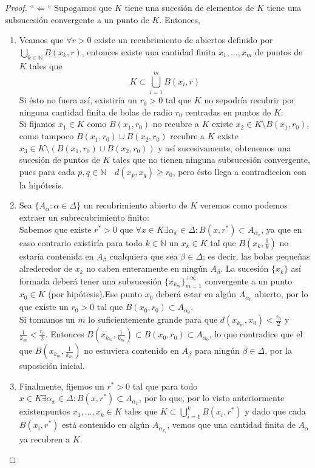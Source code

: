 \begin{proof}
    ``$\Leftarrow$``
    Supogamos que $K$ tiene una sucesión de elementos de $K$ tiene una subsucesión convergente a un punto de $K$. Entonces,
    \begin{enumerate}
        \item Veamos que $\forall r > 0$ existe un recubrimiento de abiertos definido por $\bigcup_{k \in \mathbb{N}} B(x_k, r)$, entonces existe una cantidad finita $x_1, \ldots, x_m$ de puntos de $K$ tales que $$K \subset \bigcup_{i = 1}^{m} B(x_i, r)$$ \newline
        Si ésto no fuera así, existiría un $r_0 > 0$ tal que $K$ no sepodría recubrir por ninguna cantidad finita de bolas de radio $r_0$ centradas en puntos de $K$: \\
        Si fijamos $x_1 \in K$ como $B(x_1, r_0)$ no recubre a $K$ existe $x_2 \in K \setminus B(x_1, r_0)$, como tampoco $B(x_1, r_0) \cup B(x_2, r_0)$ recubre a $K$ existe $x_3 \in K \setminus (B(x_1, r_0) \cup B(x_2, r_0))$ y así sucesivamente, obtenemos una sucesión de puntos de $K$ tales que no tienen ninguna subsucesión convergente, pues para cada $p, q \in \mathbb{N} \quad d(x_p, x_q) \geq r_0$, pero ésto llega a contradiccion con la hipótesis. 
        \item Sea $\{A_{\alpha} : \alpha \in \Delta\}$ un recubrimiento abierto de $K$ veremos como podemos extraer un subrecubrimiento finito: \\
        Sabemos que existe $r^* > 0$ que $\forall x \in K \exists \alpha_x \in \Delta : B(x, r^*) \subset A_{\alpha_x}$, ya que en caso contrario existiría para todo $k \in \mathbb{N}$ un $x_k \in K$ tal que $B(x_k, \frac{1}{k})$ no estaría contenida en $A_{\beta}$ cualquiera que sea $\beta \in \Delta$; es decir, las bolas pequeñas alrederedor de $x_k$ no caben enteramente en ningún $A_{\beta}$.
        La sucesión $\{x_k\}$ así formada deberá tener una subsucesión $\{x_{k_m}\}_{m = 1}^{+\infty}$ convergente a un punto $x_0 \in K$ (por hipótesis).Ese punto $x_0$ deberá estar en algún $A_{\alpha_0}$ abierto, por lo que existe un $r_0 > 0$ tal que $B(x_0, r_0) \subset A_{\alpha_0}$. \\
        Si tomamos un $m$ lo suficientemente grande para que $d(x_{k_m}, x_0) < \frac{r_0}{2}$ y $\frac{1}{k_m} < \frac{r_0}{2}$. Entonces $B(x_{k_m},\frac{1}{k_m}) \subset B(x_0,r_0) \subset A_{\alpha_0}$, lo que contradice que el que $B(x_{k_m},\frac{1}{k_m})$ no estuviera contenido en $A_{\beta}$ para ningún $\beta \in \Delta$, por la suposición inicial. 
        \item Finalmente, fijemos un $r^* > 0$ tal que para todo $x \in K \exists \alpha_x \in \Delta : B(x, r^*) \subset A_{\alpha_x}$, por lo que, por lo visto anteriormente existenpuntos $x_1, \ldots, x_k \in K$ tales que $K \subset \bigcup_{i = 1}^{k} B(x_i, r^*)$ y dado que cada $B(x_i, r^*)$ está contenido en algún $A_{\alpha_{x_i}}$, vemos que una cantidad finita de $A_\alpha$ ya recubren a $K$.
    \end{enumerate}
\end{proof}

